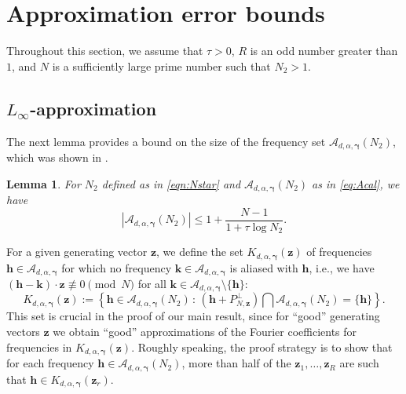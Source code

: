 \documentclass[a4paper,11pt]{article}
\newtheorem{lemma}[theorem]{Lemma}
\newcommand{\bsh}{\boldsymbol{h}}
\newcommand{\bsk}{\boldsymbol{k}}
\newcommand{\bsz}{\boldsymbol{z}}
\newcommand{\bsgamma}{\boldsymbol{\gamma}}
\newcommand{\Acal}{\mathcal{A}}
\begin{document}
\section{Approximation error bounds}\label{sec:main}

Throughout this section, we assume that $\tau>0$, $R$ is an odd number greater than $1$, and $N$ is a sufficiently large prime number such that $N_2> 1$.

\subsection{$L_\infty$-approximation}

The next lemma provides a bound on the size of the frequency set $\Acal_{d,\alpha, \bsgamma}(N_2)$, which was shown in \cite[Corollary 6]{PKG25}.
\begin{lemma}\label{lem:Adcount} For $N_2$ defined as in \eqref{eqn:Nstar} and $\Acal_{d,\alpha,\bsgamma}(N_2)$ as in \eqref{eq:Acal}, 
we have
\[ 
 |\Acal_{d,\alpha,\bsgamma}(N_2)|\leq 1+\frac{ N-1}{1+\tau\log N_2}.
\]
\end{lemma}

For a given generating vector $\bsz$, we define the set $K_{d, \alpha, \bsgamma}(\bsz)$ of frequencies $\bsh \in \Acal_{d, \alpha, \bsgamma}$ for which no frequency $\bsk \in \Acal_{d, \alpha, \bsgamma}$ is aliased with $\bsh$, i.e., we have $(\bsh - \bsk) \cdot \bsz \not\equiv 0 \pmod{N}$ for all $\bsk \in \Acal_{d, \alpha, \bsgamma}\setminus \{\bsh\}$: 
\begin{equation*}
K_{d,\alpha,\bsgamma}(\bsz):=\left\{\bsh\in \Acal_{d,\alpha,\bsgamma}(N_2)\,:\,   (\bsh+ P^\perp_{N,\bsz}) \bigcap \Acal_{d,\alpha,\bsgamma}(N_2)=\{\bsh\} \right\}.    
\end{equation*}
This set is crucial in the proof of our main result, since for ``good'' generating vectors $\bsz$ we obtain ``good'' approximations of the Fourier coefficients for frequencies in $K_{d,\alpha, \bsgamma}(\bsz)$. Roughly speaking, the proof strategy is to show that for each frequency $\bsh \in \Acal_{d,\alpha, \bsgamma}(N_2)$, more than half of the $\bsz_1, \ldots, \bsz_R$ are such that $\bsh \in K_{d,\alpha, \bsgamma}(\bsz_r)$.
\end{document}
